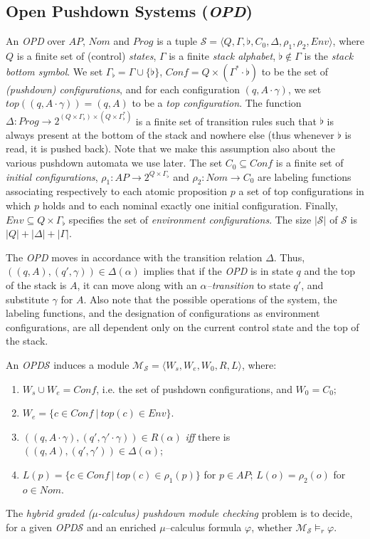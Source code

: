 \documentclass{LMCS}
\theoremstyle{plain}
\def \bottom        {\flat}
\def \Gb            {\Gamma_{\bottom}}
\def \M             {\mathcal{M}}
\def \OPD           {\emph{OPD}\xspace}
\def \S             {\mathcal{S}}
\newcommand \tpl[1] {\langle #1 \rangle}
\begin{document}
\subsection{Open Pushdown Systems
(\OPD)}\label{sub:OpenPushdownSystems} An \OPD over
$AP$, $Nom$ and $Prog$
is a tuple $\S = \tpl{Q, \Gamma, \bottom, C_0, \Delta, \rho_1,
\rho_2, Env}$, where $Q$ is a finite set of (control)
\emph{states}, $\Gamma$ is a finite \emph{stack alphabet},
$\bottom \not \in \Gamma$ is the \emph{stack bottom symbol}. We
set $\Gb= \Gamma \cup \{\bottom \}$, $Conf = Q \times (\Gamma^*
\cdot \bottom)$ to be the set of \emph{(pushdown) configurations},
and for each configuration $(q,A \cdot \gamma)$, we set $top((q,A
\cdot \gamma))=(q,A)$ to be a \emph{top configuration}. The
function $\Delta : Prog \rightarrow 2^{(Q \times \Gb) \times (Q
\times \Gb^*)}$ is a finite set of transition rules such that
$\bottom$ is always present at the bottom of the stack and nowhere
else (thus whenever $\bottom$ is read, it is pushed back). Note
that we make this assumption also about the various pushdown
automata we use later. The set $C_0 \subseteq Conf$ is a finite
set of \emph{initial configurations}, $\rho_1: AP \rightarrow 2^{Q
\times \Gb}$ and $\rho_2: Nom \rightarrow C_0$ are labeling
functions associating respectively to each atomic proposition $p$
a set of top configurations in which $p$ holds and to each nominal
exactly one initial configuration. Finally, $Env \subseteq Q
\times \Gb$ specifies the set of \emph{environment
configurations}. The size $|\S|$ of $\S$ is $|Q| + |\Delta| +
|\Gamma|$.

The \OPD moves in accordance with the transition relation
$\Delta$. Thus, $((q,A),\allowbreak (q',\gamma)) \in
\Delta(\alpha)$ implies that if the \OPD is in state $q$ and the
top of the stack is $A$, it can move along with an
\emph{$\alpha$--transition} to state $q'$, and substitute $\gamma$
for $A$. Also note that the possible operations of the system, the
labeling functions, and the designation of configurations as
environment configurations, are all dependent only on the current
control state and the top of the stack.

An \OPD $\S$ induces a module $\M_{\S} = \tpl{W_s, W_e, W_0, R,
L}$, where:
\begin{enumerate}[$\bullet$]
\item
$W_s \cup W_e = Conf$, i.e. the set of pushdown configurations,
and $W_0 = C_0$;

\item
$W_e = \{c \in Conf\ |\ top(c) \in Env\}$.

\item
$((q, A \cdot \gamma),(q', \gamma' \cdot \gamma)) \in R(\alpha)$
\emph{iff} there is $((q, A),(q', \gamma')) \in \Delta(\alpha)$;

\item
$L(p)=\{c \in Conf\ |\ top(c) \in \rho_1(p)\}$ for $p \in AP$;
$L(o)=\rho_2(o)$ for $o \in Nom$.
\end{enumerate}
The \emph{hybrid graded ($\mu$-calculus) pushdown module checking}
problem is to decide, for a given \OPD $\S$ and an enriched
$\mu$--calculus formula $\varphi$, whether $\M_{\S} \models_r
\varphi$.
\end{document}
